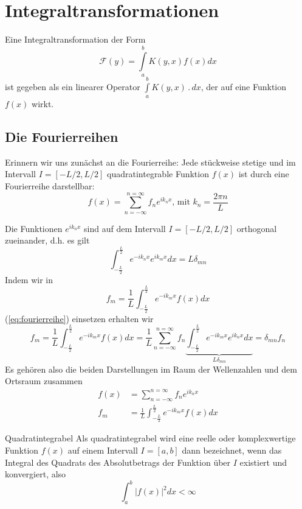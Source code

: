 \chapter{Integraltransformationen}
Eine Integraltransformation der Form
\begin{equation}
  \mathcal{F}(y)=\int\limits_a^bK(y,x)f(x)dx
  \label{eq:IntTrafo}
\end{equation}
ist gegeben als ein linearer Operator $\int\limits_a^bK(y,x)\,.\,dx$, der auf
eine Funktion $f(x)$ wirkt.
\section{Die Fourierreihen}
Erinnern wir uns zunächst an die Fourierreihe: Jede stückweise stetige und im
Intervall $I=[-L/2,L/2]$ quadratintegrable Funktion $f(x)$ ist durch eine
Fourierreihe darstellbar:
\begin{equation}\label{eq:fourierreihe}
f(x)=\sum_{n=-\infty}^{n=\infty}f_n e^{ik_n x}\mbox{, mit }k_n=\frac{2\pi n}{L}
\end{equation}

Die Funktionen $e^{ik_nx}$ sind auf dem Intervall $I=[-L/2,L/2]$ orthogonal zueinander, d.h.
es gilt
\[ \int_{-\frac{L}{2}}^{\frac{L}{2}}e^{-ik_nx}e^{ik_mx}dx=L\delta_{mn}\]
Indem wir in
\begin{equation}\label{eq:fm}
f_m=\frac{1}{L}\int_{-\frac{L}{2}}^{\frac{L}{2}}e^{-ik_mx}f(x)dx
\end{equation}
(\ref{eq:fourierreihe}) einsetzen erhalten wir 
\begin{equation}\label{eq:fm}
f_m=\frac{1}{L}\int_{-\frac{L}{2}}^{\frac{L}{2}}e^{-ik_mx}f(x)dx=\frac{1}{L}
\sum_{n=-\infty}^{n=\infty}f_n\underbrace{\int_{-\frac{L}{2}}^{\frac{L}{2}}e^{-ik_mx}e^{ik_nx}dx}_{L\delta_{mn}}
=\delta_{mn}f_n
\end{equation}
Es gehören also die beiden Darstellungen im Raum der Wellenzahlen und dem Ortsraum zusammen
\begin{align}
  f(x)&=\sum_{n=-\infty}^{n=\infty}f_n e^{ik_n x}\\
f_m&=\frac{1}{L}\int_{-\frac{L}{2}}^{\frac{L}{2}}e^{-ik_mx}f(x)dx
\end{align}
\begin{note}{Quadratintegrabel}
Als quadratintegrabel wird eine reelle oder komplexwertige Funktion $f(x)$ auf
einem Intervall $I=[a,b]$ dann bezeichnet, wenn das Integral des Quadrats des
Absolutbetrags der Funktion über $I$ existiert und konvergiert, also
\[\int_a^b |f(x)|^2dx<\infty\]
\end{note}
%
